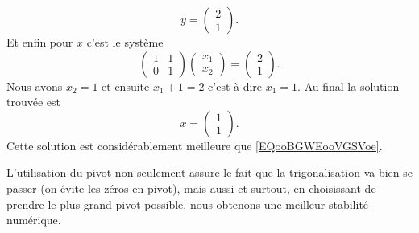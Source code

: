 \begin{example}
    \begin{equation}
        y=\begin{pmatrix}
            2    \\
            1
        \end{pmatrix}.
    \end{equation}
    Et enfin pour \( x\) c'est le système
    \begin{equation}
        \begin{pmatrix}
            1    &   1    \\
            0    &   1
        \end{pmatrix}\begin{pmatrix}
            x_1    \\
            x_2
        \end{pmatrix}=\begin{pmatrix}
            2    \\
            1
        \end{pmatrix}.
    \end{equation}
    Nous avons \( x_2=1\) et ensuite \( x_1+1=2\) c'est-à-dire \( x_1=1\). Au final la solution trouvée est
    \begin{equation}
        x=\begin{pmatrix}
            1    \\
            1
        \end{pmatrix}.
    \end{equation}
    Cette solution est considérablement meilleure que \eqref{EQooBGWEooVGSVoe}.
\end{example}

\begin{normaltext}
    L'utilisation du pivot non seulement assure le fait que la trigonalisation va bien se passer (on évite les zéros en pivot), mais aussi et surtout, en choisissant de prendre le plus grand pivot possible, nous obtenons une meilleur stabilité numérique.
\end{normaltext}
